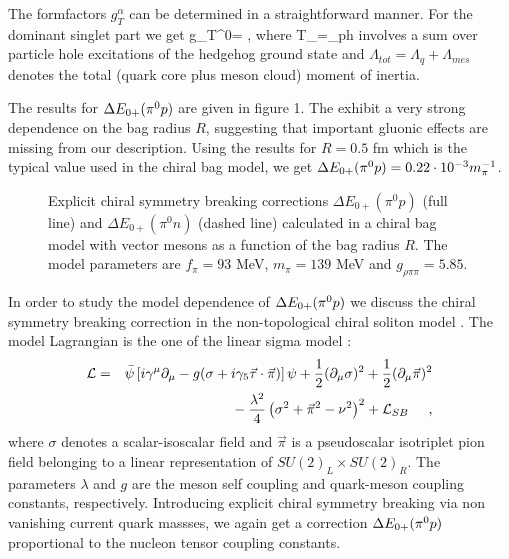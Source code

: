The formfactors $g_T^{\alpha}$ can be determined in a 
straightforward manner. For the dominant singlet part we get
\be
\label{g0c}
g_T^{0}=\; ,
\ee
where
\be
T_{\sigma\tau}=\sum_{ph}
\ee
involves a sum over particle hole excitations of the hedgehog
ground state and  $\Lambda_{tot}=\Lambda_{q}+\Lambda_{mes}$ denotes 
the total (quark core plus meson cloud) moment of inertia.

The results for $\Delta E_{0+}(\pi^0 p)$ are given in figure 1. The exhibit a very strong
dependence on the bag radius $R$, suggesting that important gluonic
effects are missing from our description. Using the results for
$R=0.5$ fm which is the typical value used in the chiral bag model,
we get $\Delta E_{0+}(\pi^0 p)=0.22\cdot 10^{-3} m_\pi^{-1}$.  

\begin{figure}
\caption{Explicit chiral symmetry breaking corrections $\Delta
E_{0+}(\pi^0 p)$ (full line) and $\Delta E_{0+} (\pi^0 n)$ (dashed 
line) calculated in a chiral bag model with vector mesons as a function
of the bag radius $R$. The model parameters are $f_{\pi}=93$ MeV,
$m_{\pi}=139$ MeV and $g_{\rho\pi\pi}=5.85$.}
\vspace{7cm}
\end{figure}


In order to study the model dependence of $\Delta E_{0+}(\pi^0 p)$ we discuss
the chiral symmetry breaking correction in the non-topological chiral soliton 
model \cite{BB85}. The model Lagrangian is the one of the linear
sigma model :
\begin{eqnarray}
\label{Lsig}
{\cal L}&=&\bar{\psi}\left[ i\gamma^{\mu}\partial_{\mu}
-g(\sigma+i\gamma_5\vec{\tau}\cdot\vec{\pi})\right]\psi 
+\frac{1}{2}(\partial_{\mu}\sigma)^2
+\frac{1}{2}(\partial_{\mu}\vec{\pi})^2 \nonumber \\
& &\mbox{}-\frac{\lambda^2}{4}\left(\sigma^2+\vec{\pi}^2-\nu^2\right)^2
 + {\cal L}_{SB} \hspace{0.5cm},
\end{eqnarray}  
where $\sigma$ denotes a scalar-isoscalar field and $\vec{\pi}$ is a
pseudoscalar isotriplet pion field belonging to a linear representation of
$SU(2)_L\times SU(2)_R$. The parameters $\lambda$ and $g$ are the meson self
coupling and quark-meson coupling constants, respectively. Introducing 
explicit chiral symmetry breaking via non vanishing current quark massses,
we again get a correction $\Delta E_{0+}(\pi^0 p)$ proportional to the nucleon tensor
coupling constants. 

